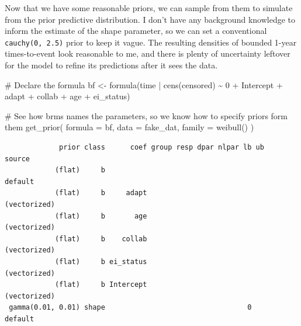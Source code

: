 \documentclass[
  letterpaper,
  DIV=11,
  numbers=noendperiod]{scrreprt}
\newenvironment{Shaded}{\begin{snugshade}}{\end{snugshade}}
\newcommand{\AttributeTok}[1]{\textcolor[rgb]{0.40,0.45,0.13}{#1}}
\newcommand{\CommentTok}[1]{\textcolor[rgb]{0.37,0.37,0.37}{#1}}
\newcommand{\DecValTok}[1]{\textcolor[rgb]{0.68,0.00,0.00}{#1}}
\newcommand{\FunctionTok}[1]{\textcolor[rgb]{0.28,0.35,0.67}{#1}}
\newcommand{\NormalTok}[1]{\textcolor[rgb]{0.00,0.23,0.31}{#1}}
\newcommand{\OtherTok}[1]{\textcolor[rgb]{0.00,0.23,0.31}{#1}}
\newcommand{\SpecialCharTok}[1]{\textcolor[rgb]{0.37,0.37,0.37}{#1}}
\begin{document}
Now that we have some reasonable priors, we can sample from them to
simulate from the prior predictive distribution. I don't have any
background knowledge to inform the estimate of the shape parameter, so
we can set a conventional \texttt{cauchy(0,\ 2.5)} prior to keep it
vague. The resulting densities of bounded 1-year times-to-event look
reasonable to me, and there is plenty of uncertainty leftover for the
model to refine its predictions after it sees the data.

\begin{Shaded}
\begin{Highlighting}[]
\CommentTok{\# Declare the formula}
\NormalTok{bf }\OtherTok{\textless{}{-}} \FunctionTok{formula}\NormalTok{(time }\SpecialCharTok{|} \FunctionTok{cens}\NormalTok{(censored) }\SpecialCharTok{\textasciitilde{}} \DecValTok{0} \SpecialCharTok{+}\NormalTok{ Intercept }\SpecialCharTok{+}\NormalTok{ adapt }\SpecialCharTok{+}\NormalTok{ collab }\SpecialCharTok{+}\NormalTok{ age }\SpecialCharTok{+}\NormalTok{ ei\_status)}

\CommentTok{\# See how brms names the parameters, so we know how to specify priors form them}
\FunctionTok{get\_prior}\NormalTok{(}
  \AttributeTok{formula =}\NormalTok{ bf,}
  \AttributeTok{data =}\NormalTok{ fake\_dat,}
  \AttributeTok{family =} \FunctionTok{weibull}\NormalTok{()}
\NormalTok{)}
\end{Highlighting}
\end{Shaded}

\begin{verbatim}
             prior class      coef group resp dpar nlpar lb ub       source
            (flat)     b                                            default
            (flat)     b     adapt                             (vectorized)
            (flat)     b       age                             (vectorized)
            (flat)     b    collab                             (vectorized)
            (flat)     b ei_status                             (vectorized)
            (flat)     b Intercept                             (vectorized)
 gamma(0.01, 0.01) shape                                  0         default
\end{verbatim}
\end{document}

